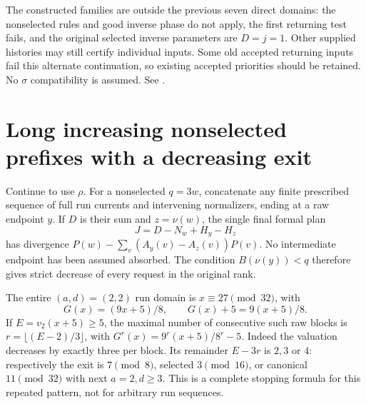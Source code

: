 \documentclass[11pt]{article}
\begin{document}
The constructed families are outside the previous seven direct domains:
the nonselected rules and good inverse phase do not apply, the first
returning test fails, and the original selected inverse parameters are
$D=j=1$. Other supplied histories may still certify individual inputs.
Some old accepted returning inputs fail this alternate continuation, so
existing accepted priorities should be retained. No $\sigma$ compatibility
is assumed. See
.

\section{Long increasing nonselected prefixes with a decreasing exit}
Continue to use $\rho$. For a nonselected $q=3w$, concatenate any finite
prescribed sequence of full run currents and intervening normalizers,
ending at a raw endpoint $y$. If $D$ is their sum and $z=\nu(w)$, the
single final formal plan
\[
 J=D-N_w+H_y-H_z
\]
has divergence $P(w)-\sum_v(A_y(v)-A_z(v))P(v)$. No intermediate
endpoint has been assumed absorbed. The condition $B(\nu(y))<q$
therefore gives strict decrease of every request in the original rank.

The entire $(a,d)=(2,2)$ run domain is $x\equiv27\pmod{32}$, with
\[
 G(x)=(9x+5)/8,\qquad G(x)+5=9(x+5)/8.
\]
If $E=v_2(x+5)\ge5$, the maximal number of consecutive such raw blocks
is $r=\lfloor(E-2)/3\rfloor$, with
$G^r(x)=9^r(x+5)/8^r-5$. Indeed the valuation decreases by exactly
three per block. Its remainder $E-3r$ is $2,3$ or $4$: respectively
the exit is $7\pmod8$, selected $3\pmod{16}$, or canonical
$11\pmod{32}$ with next $a=2,d\ge3$. This is a complete stopping
formula for this repeated pattern, not for arbitrary run sequences.
\end{document}
